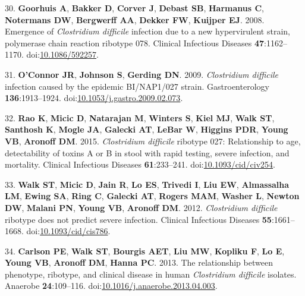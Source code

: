 \documentclass[
  12pt,
]{article}
\newenvironment{cslreferences}%
  {}%
  {\par}
\begin{document}
\begin{cslreferences}
\leavevmode\hypertarget{ref-Goorhuis2008}{}%
30. \textbf{Goorhuis A}, \textbf{Bakker D}, \textbf{Corver J},
\textbf{Debast SB}, \textbf{Harmanus C}, \textbf{Notermans DW},
\textbf{Bergwerff AA}, \textbf{Dekker FW}, \textbf{Kuijper EJ}. 2008.
Emergence of \emph{Clostridium difficile} infection due to a new
hypervirulent strain, polymerase chain reaction ribotype 078. Clinical
Infectious Diseases \textbf{47}:1162--1170.
doi:\href{https://doi.org/10.1086/592257}{10.1086/592257}.

\leavevmode\hypertarget{ref-OConnor2009}{}%
31. \textbf{O'Connor JR}, \textbf{Johnson S}, \textbf{Gerding DN}. 2009.
\emph{Clostridium difficile} infection caused by the epidemic
BI/NAP1/027 strain. Gastroenterology \textbf{136}:1913--1924.
doi:\href{https://doi.org/10.1053/j.gastro.2009.02.073}{10.1053/j.gastro.2009.02.073}.

\leavevmode\hypertarget{ref-Rao2015}{}%
32. \textbf{Rao K}, \textbf{Micic D}, \textbf{Natarajan M},
\textbf{Winters S}, \textbf{Kiel MJ}, \textbf{Walk ST}, \textbf{Santhosh
K}, \textbf{Mogle JA}, \textbf{Galecki AT}, \textbf{LeBar W},
\textbf{Higgins PDR}, \textbf{Young VB}, \textbf{Aronoff DM}. 2015.
\emph{Clostridium difficile} ribotype 027: Relationship to age,
detectability of toxins A or B in stool with rapid testing, severe
infection, and mortality. Clinical Infectious Diseases
\textbf{61}:233--241.
doi:\href{https://doi.org/10.1093/cid/civ254}{10.1093/cid/civ254}.

\leavevmode\hypertarget{ref-Walk2012}{}%
33. \textbf{Walk ST}, \textbf{Micic D}, \textbf{Jain R}, \textbf{Lo ES},
\textbf{Trivedi I}, \textbf{Liu EW}, \textbf{Almassalha LM},
\textbf{Ewing SA}, \textbf{Ring C}, \textbf{Galecki AT}, \textbf{Rogers
MAM}, \textbf{Washer L}, \textbf{Newton DW}, \textbf{Malani PN},
\textbf{Young VB}, \textbf{Aronoff DM}. 2012. \emph{Clostridium
difficile} ribotype does not predict severe infection. Clinical
Infectious Diseases \textbf{55}:1661--1668.
doi:\href{https://doi.org/10.1093/cid/cis786}{10.1093/cid/cis786}.

\leavevmode\hypertarget{ref-Carlson2013}{}%
34. \textbf{Carlson PE}, \textbf{Walk ST}, \textbf{Bourgis AET},
\textbf{Liu MW}, \textbf{Kopliku F}, \textbf{Lo E}, \textbf{Young VB},
\textbf{Aronoff DM}, \textbf{Hanna PC}. 2013. The relationship between
phenotype, ribotype, and clinical disease in human \emph{Clostridium
difficile} isolates. Anaerobe \textbf{24}:109--116.
doi:\href{https://doi.org/10.1016/j.anaerobe.2013.04.003}{10.1016/j.anaerobe.2013.04.003}.


\end{cslreferences}
\end{document}
